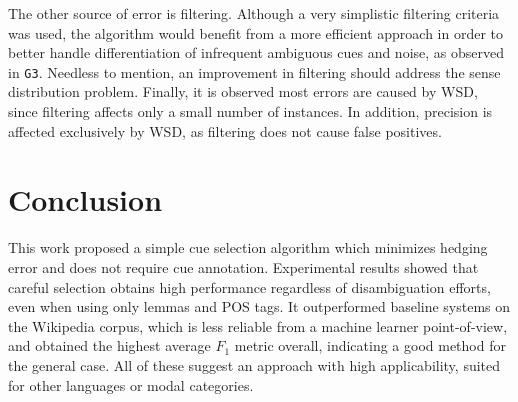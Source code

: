 \documentclass[english]{jnlp_1.4}
\begin{document}
The other source of error is filtering. Although a very simplistic filtering criteria was used, the algorithm would benefit from a more efficient approach in order to better handle differentiation of infrequent ambiguous cues and noise, as observed in \texttt{G3}. Needless to mention, an improvement in filtering should address the sense distribution problem. Finally, it is observed most errors are caused by WSD, since filtering affects only a small number of instances. In addition, precision is affected exclusively by WSD, as filtering does not cause false positives.


\section{Conclusion}
\label{sec:conclusion}

This work proposed a simple cue selection algorithm which minimizes hedging error and does not require cue annotation. Experimental results showed that careful selection obtains high performance regardless of disambiguation efforts, even when using only lemmas and POS tags. It outperformed baseline systems on the Wikipedia corpus, which is less reliable from a machine learner point-of-view, and obtained the highest average $F_1$ metric overall, indicating a good method for the general case. All of these suggest an approach with high applicability, suited for other languages or modal categories.
\end{document}
